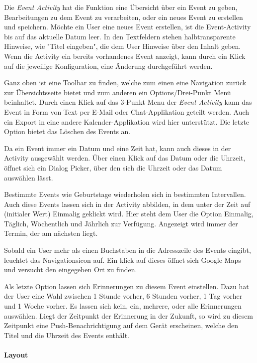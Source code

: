 Die \textit{Event Activity} hat die Funktion eine Übersicht über ein Event zu geben, Bearbeitungen zu dem Event zu verarbeiten, oder ein neues Event zu erstellen und speichern. Möchte ein User eine neues Event erstellen, ist die Event-Activity bis auf das aktuelle Datum leer. In den Textfeldern stehen halbtransparente Hinweise, wie "Titel eingeben", die dem User Hinweise über den Inhalt geben. Wenn die Activity ein bereits vorhandenes Event anzeigt, kann durch ein Klick auf die jeweilige Konfiguration, eine Änderung durchgeführt werden.

Ganz oben ist eine Toolbar zu finden, welche zum einen eine Navigation zurück zur Übersichtsseite bietet und zum anderen ein Options/Drei-Punkt Menü beinhaltet. Durch einen Klick auf das 3-Punkt Menu der \textit{Event Activity}  kann das Event in Form von Text per E-Mail oder Chat-Applikation geteilt werden. Auch ein Export in eine andere Kalender-Applikation wird hier unterstützt. Die letzte Option bietet das Löschen des Events an.

Da ein Event immer ein Datum und eine Zeit hat, kann auch dieses in der Activity ausgewählt werden. Über einen Klick auf das Datum oder die Uhrzeit, öffnet sich ein Dialog Picker, über den sich die Uhrzeit oder das Datum auswählen lässt.

Bestimmte Events wie Geburtstage wiederholen sich in bestimmten Intervallen. Auch diese Events lassen sich in der Activity abbilden, in dem unter der Zeit auf (initialer Wert) Einmalig geklickt wird. Hier steht dem User die Option Einmalig, Täglich, Wöchentlich und Jährlich zur Verfügung. Angezeigt wird immer der Termin, der am nächsten liegt.

Sobald ein User mehr als einen Buchstaben in die Adresszeile des Events eingibt, leuchtet das Navigationsicon auf. Ein klick auf dieses öffnet sich Google Maps und versucht den eingegeben Ort zu finden.

Als letzte Option lassen sich Erinnerungen zu diesem Event einstellen. Dazu hat der User eine Wahl zwischen 1 Stunde vorher, 6 Stunden vorher, 1 Tag vorher und 1 Woche vorher. Es lassen sich kein, ein, mehrere, oder alle Erinnerungen auswählen. Liegt der Zeitpunkt der Erinnerung in der Zukunft, so wird zu diesem Zeitpunkt eine Push-Benachrichtigung auf dem Gerät erscheinen, welche den Titel und die Uhrzeit des Events enthält.

\paragraph{Layout}

